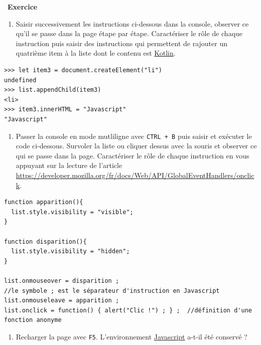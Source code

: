 \documentclass[
  11pt,
]{article}
\newcommand{\passthrough}[1]{#1}
\providecommand{\tightlist}{%
  \setlength{\itemsep}{0pt}\setlength{\parskip}{0pt}}
\newcounter{exo}
\newenvironment{exercice}[1]
{\par \medskip   \addtocounter{exo}{1} \noindent  
\begin{bclogo}[arrondi =0.1,   noborder = true, logo=\bccrayon, marge=4]{~\textbf{Exercice} \textbf{\theexo} {\itshape #1} }  \par}
{
\end{bclogo}
 \par \bigskip }
\newcounter{def}
\begin{document}
\begin{exercice}{}
\begin{enumerate}
\def\labelenumi{\arabic{enumi}.}
\setcounter{enumi}{1}
\tightlist
\item
  Saisir successivement les instructions ci-dessous dans la console,
  observer ce qu'il se passe dans la page étape par étape. Caractériser
  le rôle de chaque instruction puis saisir des instructions qui
  permettent de rajouter un quatrième item à la liste dont le contenu
  est \href{https://fr.wikipedia.org/wiki/Kotlin_(langage)}{Kotlin}.
\end{enumerate}

\begin{lstlisting}
>>> let item3 = document.createElement("li")
undefined
>>> list.appendChild(item3)
<li>
>>> item3.innerHTML = "Javascript"
"Javascript"
\end{lstlisting}

\begin{enumerate}
\def\labelenumi{\arabic{enumi}.}
\setcounter{enumi}{2}
\tightlist
\item
  Passer la console en mode mutliligne avec
  \passthrough{\lstinline!CTRL + B!} puis saisir et exécuter le code
  ci-dessous. Survoler la liste ou cliquer dessus avec la souris et
  observer ce qui se passe dans la page. Caractériser le rôle de chaque
  instruction en vous appuyant sur la lecture de l'article
  \url{https://developer.mozilla.org/fr/docs/Web/API/GlobalEventHandlers/onclick}.
\end{enumerate}

\begin{lstlisting}
function apparition(){
  list.style.visibility = "visible";
}

function disparition(){
  list.style.visibility = "hidden";
}

list.onmouseover = disparition ;  
//le symbole ; est le séparateur d'instruction en Javascript
list.onmouseleave = apparition ;
list.onclick = function() { alert("Clic !") ; } ;  //définition d'une fonction anonyme
\end{lstlisting}

\begin{enumerate}
\def\labelenumi{\arabic{enumi}.}
\setcounter{enumi}{3}
\tightlist
\item
  Recharger la page avec \passthrough{\lstinline!F5!}. L'environnement
  \href{https://developer.mozilla.org/fr/docs/Glossaire/JavaScript}{Javascript}
  a-t-il été conservé ?
\end{enumerate}

\end{exercice}
\end{document}

